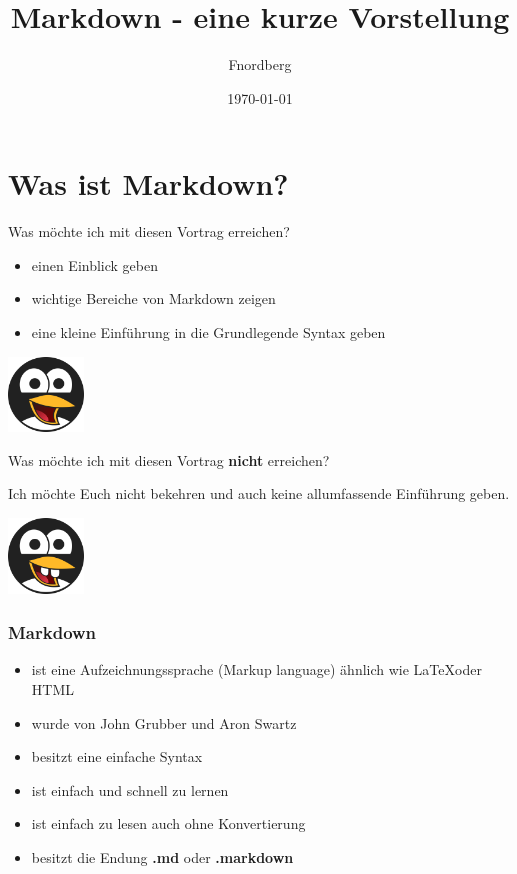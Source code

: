 \documentclass{beamer}
\title{Markdown - eine kurze Vorstellung}
\author{Fnordberg}
\date{\today}
\begin{document}
\maketitle

\section{Was ist Markdown?}
\begin{frame}{Was möchte ich mit diesen Vortrag erreichen?}
    \begin{minipage}[b]{80mm}
        \begin{itemize}
            \item einen Einblick geben
            \item wichtige Bereiche von Markdown zeigen
            \item eine kleine Einführung in die Grundlegende Syntax geben
        \end{itemize}
    \end{minipage}
        \hfill
    \begin{minipage}[b]{20mm}
        \includegraphics[width=20mm]{pic-tux_1.png}
    \end{minipage}
\end{frame}

\begin{frame}{Was möchte ich mit diesen Vortrag \textbf{nicht} erreichen?}
    \begin{minipage}[b]{80mm}
        Ich möchte Euch nicht bekehren und auch keine allumfassende Einführung geben.
    \end{minipage}
        \hfill
    \begin{minipage}[b]{20mm}
        \includegraphics[width=20mm]{pic-tux_2.png}
    \end{minipage}
\end{frame}


\begin{frame} %
  \frametitle{Markdown} %
    \begin{itemize}
        \item ist eine Aufzeichnungssprache (Markup language) ähnlich wie \LaTeX oder HTML
        \item wurde von John Grubber und Aron Swartz
        \item besitzt eine einfache Syntax
        \item ist einfach und schnell zu lernen
        \item ist einfach zu lesen auch ohne Konvertierung 
        \item besitzt die Endung \textbf{.md} oder \textbf{.markdown}
    \end{itemize}
\end{frame}
\end{document}
